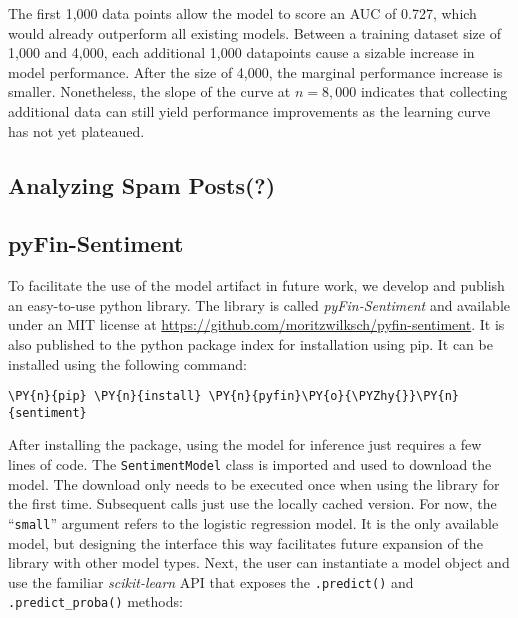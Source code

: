 The first 1,000 data points allow the model to score an AUC of 0.727, which would already outperform all existing models. Between a training dataset size of 1,000 and 4,000, each additional 1,000 datapoints cause a sizable increase in model performance. After the size of 4,000, the marginal performance increase is smaller. Nonetheless, the slope of the curve at $n=8,000$ indicates that collecting additional data can still yield performance improvements as the learning curve has not yet plateaued. 

\subsection{Analyzing Spam Posts(?)}

\subsection{pyFin-Sentiment}
To facilitate the use of the model artifact in future work, we develop and publish an easy-to-use python library. The library is called \emph{pyFin-Sentiment} and available under an MIT license at \url{https://github.com/moritzwilksch/pyfin-sentiment}. It is also published to the python package index for installation using pip. It can be installed using the following command:

\begin{Verbatim}[commandchars=\\\{\}]
\PY{n}{pip} \PY{n}{install} \PY{n}{pyfin}\PY{o}{\PYZhy{}}\PY{n}{sentiment}
\end{Verbatim}

After installing the package, using the model for inference just requires a few lines of code. The \texttt{SentimentModel} class is imported and used to download the model. The download only needs to be executed once when using the library for the first time. Subsequent calls just use the locally cached version. For now, the ``\texttt{small}'' argument refers to the logistic regression model. It is the only available model, but designing the interface this way facilitates future expansion of the library with other model types. Next, the user can instantiate a model object and use the familiar \emph{scikit-learn} API that exposes the \texttt{.predict()} and \texttt{.predict\_proba()} methods:



